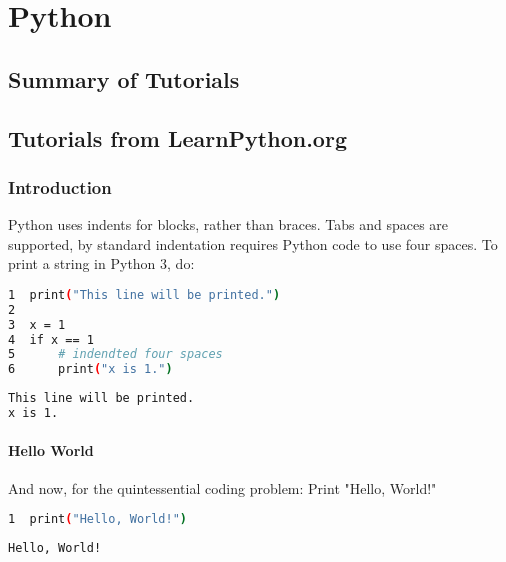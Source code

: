 \documentclass[crop=false,class=book]{standalone}
\begin{document}
\chapter{Python}
\section{Summary of Tutorials}
\section{Tutorials from LearnPython.org}
\subsection{Introduction}
Python uses indents for blocks, rather than braces. Tabs and spaces are supported, by standard indentation requires Python code to use four spaces. To print a string in Python 3, do:\newline
\begin{minipage}[t]{.48\textwidth}
\centering
\begin{lstlisting}[language=bash,basicstyle=\small\ttfamily,frame=single,caption=input]
1  print("This line will be printed.")
2
3  x = 1
4  if x == 1
5      # indendted four spaces
6      print("x is 1.")
\end{lstlisting}
\end{minipage}\hfill
\begin{minipage}[t]{.48\textwidth}
\centering
\begin{lstlisting}[language=bash,basicstyle=\small\ttfamily,frame=single,caption=output]
This line will be printed.
x is 1.
\end{lstlisting}
\end{minipage}
\subsubsection{Hello World}
And now, for the quintessential coding problem: Print "Hello, World!"\newline
\begin{minipage}[t]{.48\textwidth}
\centering
\begin{lstlisting}[language=bash,basicstyle=\small\ttfamily,frame=single,caption=input]
1  print("Hello, World!")
\end{lstlisting}
\end{minipage}\hfill
\begin{minipage}[t]{.48\textwidth}
\centering
\begin{lstlisting}[language=bash,basicstyle=\small\ttfamily,frame=single,caption=output]
Hello, World!
\end{lstlisting}
\end{minipage}
\end{document}
